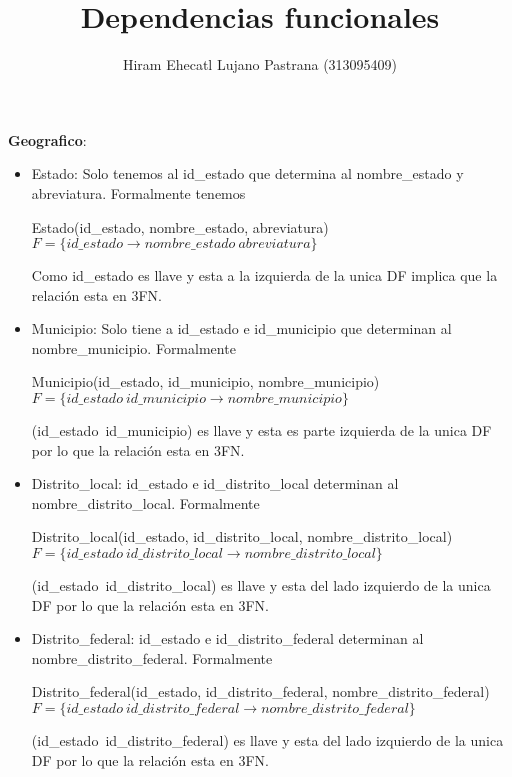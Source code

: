 \documentclass[a4paper,twoside,11pt]{article}
\title{Dependencias funcionales}
\author{Hiram Ehecatl Lujano Pastrana (313095409)}
\begin{document}
\maketitle

\textbf{Geografico}:
\begin{itemize}
  \item Estado: Solo tenemos al id\_estado que determina al nombre\_estado
        y abreviatura. Formalmente tenemos

        Estado(id\_estado, nombre\_estado, abreviatura)\\
        $F=\{id\_estado \rightarrow nombre\_estado~abreviatura\}$

        Como id\_estado es llave y esta a la izquierda de la unica DF implica
        que la relación esta en 3FN.

  \item Municipio: Solo tiene a id\_estado e id\_municipio que determinan
        al nombre\_municipio.
        Formalmente

        Municipio(id\_estado, id\_municipio, nombre\_municipio)\\
        $F=\{id\_estado~id\_municipio\rightarrow nombre\_municipio\}$

        (id\_estado~id\_municipio) es llave y esta es parte izquierda
        de la unica DF por lo que la relación esta en 3FN.

  \item Distrito\_local: id\_estado e id\_distrito\_local determinan al
        nombre\_distrito\_local. Formalmente

        Distrito\_local(id\_estado, id\_distrito\_local, nombre\_distrito\_local)\\
        $F=\{id\_estado~id\_distrito\_local\rightarrow nombre\_distrito\_local\}$

        (id\_estado~id\_distrito\_local) es llave y esta del lado izquierdo de
        la unica DF por lo que la relación esta en 3FN.

  \item Distrito\_federal: id\_estado e id\_distrito\_federal determinan al
        nombre\_distrito\_federal. Formalmente

        Distrito\_federal(id\_estado, id\_distrito\_federal, nombre\_distrito\_federal)\\
        $F=\{id\_estado~id\_distrito\_federal\rightarrow nombre\_distrito\_federal\}$

        (id\_estado~id\_distrito\_federal) es llave y esta del lado izquierdo de
        la unica DF por lo que la relación esta en 3FN.


\end{itemize}
\end{document}

